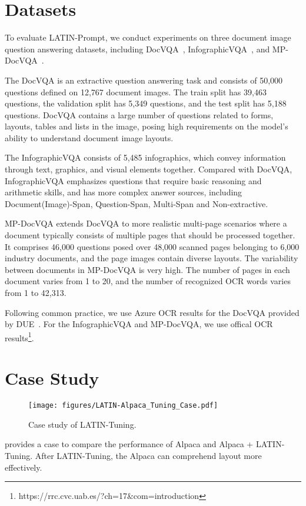 \documentclass[letterpaper]{article} \usepackage{aaai24_preprint}  \usepackage{times}  \usepackage{helvet}  \usepackage{courier}  \usepackage[hyphens]{url}  \usepackage{graphicx} \urlstyle{rm} \def\UrlFont{\rm}  \usepackage{natbib}  \usepackage{caption} \frenchspacing  \setlength{\pdfpagewidth}{8.5in} \setlength{\pdfpageheight}{11in} \usepackage{algorithm}
\begin{document}
\section{Datasets}
\label{sec:exp_settings}
To evaluate LATIN-Prompt, we conduct experiments on three document image question answering datasets, including DocVQA~\cite{mathewDocVQA2021}, InfographicVQA~\cite{mathewInfographicVQA2021}, and MP-DocVQA~\cite{titoMulti-PageDocVQAHi-VT52023}.

The DocVQA is an extractive question answering task and consists of 50,000 questions defined on 12,767 document images.
The train split has 39,463 questions, the validation split has 5,349 questions, and the test split has 5,188 questions.
DocVQA contains a large number of questions related to forms, layouts, tables and lists in the image, posing high requirements on the model's ability to understand document image layouts.

The InfographicVQA consists of 5,485 infographics, which convey information through text, graphics, and visual elements together.
Compared with DocVQA, InfographicVQA emphasizes questions that require basic reasoning and arithmetic skills, and has more complex answer sources, including Document(Image)-Span, Question-Span, Multi-Span and Non-extractive.

MP-DocVQA extends DocVQA to more realistic multi-page scenarios where a document typically consists of multiple pages that should be processed together.
It comprises 46,000 questions posed over 48,000 scanned pages belonging to 6,000 industry documents, and the page images contain diverse layouts.
The variability between documents in MP-DocVQA is very high.
The number of pages in each document varies from 1 to 20, and the number of recognized OCR words varies from 1 to 42,313.

Following common practice, we use Azure OCR results for the DocVQA provided by DUE~\cite{borchmannDUEEndtoEndDocument2021}.
For the InfographicVQA and MP-DocVQA, we use offical OCR results\footnote{https://rrc.cvc.uab.es/?ch=17\&com=introduction}.

\section{Case Study}
\begin{figure}[h]
\small
\centering
\texttt{[image: figures/LATIN-Alpaca\_Tuning\_Case.pdf]}
\caption{
Case study of LATIN-Tuning.
}
\label{fig:LATIN-Tuning_case}
\end{figure}

 provides a case to compare the performance of Alpaca and Alpaca + LATIN-Tuning.
After LATIN-Tuning, the Alpaca can comprehend layout more effectively.
\end{document}
